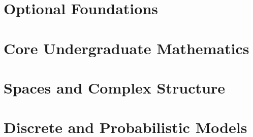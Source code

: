 \documentclass[oneside]{book}
\theoremstyle{definition}
\begin{document}
\frontmatter
\tableofcontents



\mainmatter
\part{Optional Foundations}





\part{Core Undergraduate Mathematics}









\part{Spaces and Complex Structure}





\part{Discrete and Probabilistic Models}





\backmatter

\end{document}
